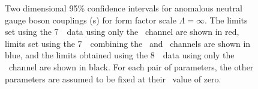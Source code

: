 \begin{figure}[htbp]
\begin{center}
\caption[Two dimensional 95\% confidence intervals for anomalous neutral
           gauge boson couplings (\TGC s) for form factor scale
           $\Lambda=\infty$.]{  Two dimensional 95\% confidence intervals for anomalous neutral
           gauge boson couplings (\TGC s) for form factor scale
           $\Lambda=\infty$. The limits set
           using the 7~\tev\ data using only the \ZZllll\ channel are shown in
           red, limits set using the 7~\tev\ combining the \ZZllll\ and \ZZllvv\
           channels are shown in blue, and the limits obtained using the 8~\tev\
           data using only the \ZZllll\ channel are shown in black. For each pair of parameters, the other parameters
           are assumed to be fixed at their \sm\ value of zero. 
}
\label{fig:TGC-limits-2D}
\end{center}
\end{figure}



